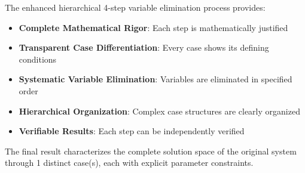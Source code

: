\documentclass{article}
\begin{document}
The enhanced hierarchical 4-step variable elimination process provides:
\begin{itemize}
\item \textbf{Complete Mathematical Rigor}: Each step is mathematically justified
\item \textbf{Transparent Case Differentiation}: Every case shows its defining conditions
\item \textbf{Systematic Variable Elimination}: Variables are eliminated in specified order
\item \textbf{Hierarchical Organization}: Complex case structures are clearly organized
\item \textbf{Verifiable Results}: Each step can be independently verified
\end{itemize}

The final result characterizes the complete solution space of the original system
through 1 distinct case(s), each with explicit parameter constraints.
\end{document}
